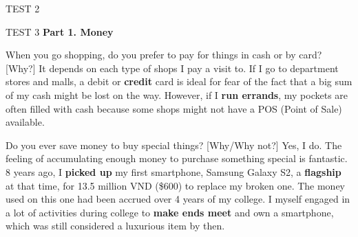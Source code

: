 \begin{glossarymc}[Cambridge 13]
\begin{test}{TEST 2}
\begin{VocabHighlights}
    \end{VocabHighlights}
    \end{test}

    \begin{test}{TEST 3}
    \noindent
    \textbf{Part 1. Money}
    \begin{qa}{When you go shopping, do you prefer to pay for things in cash or by card? [Why?]}
    It depends on each type of shops I pay a visit to. If I go to department stores and malls, a debit or \textbf{credit} card is ideal for fear of the fact that a big sum of my cash might be lost on the way. However, if I \textbf{run errands}, my pockets are often filled with cash because some shops might not have a POS (Point of Sale) available.
    \end{qa}

    \begin{qa}{Do you ever save money to buy special things? [Why/Why not?]}
    Yes, I do. The feeling of accumulating enough money to purchase something special is fantastic. 8 years ago, I \textbf{picked up} my first smartphone, Samsung Galaxy S2, a \textbf{flagship} at that time, for 13.5 million VND (\$600) to replace my broken one. The money used on this one had been accrued over 4 years of my college. I myself engaged in a lot of activities during college to \textbf{make ends meet} and own a smartphone, which was still considered a luxurious item by then.
    \end{qa}


\end{test}
\end{glossarymc}
